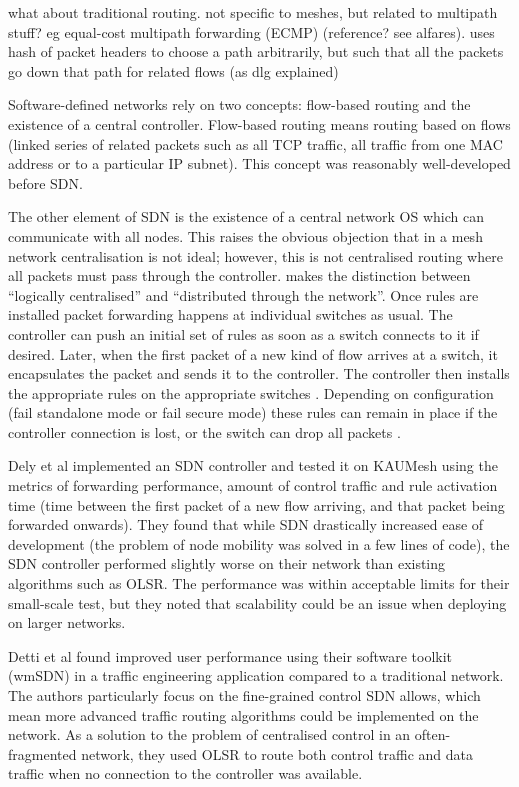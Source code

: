 what about traditional routing. not specific to meshes, but related to multipath stuff? eg equal-cost multipath forwarding (ECMP) (reference? see alfares). uses hash of packet headers to choose a path arbitrarily, but such that all the packets go down that path for related flows (as dlg explained) \cite{alfares:hedera}

Software-defined networks rely on two concepts: flow-based routing and the existence of a central controller. Flow-based routing means routing based on flows (linked series of related packets such as all TCP traffic, all traffic from one MAC address or to a particular IP subnet). This concept was reasonably well-developed \cite{wellons:oblivious,wang:routing} before SDN.

The other element of SDN is the existence of a central network OS which can communicate with all nodes. This raises the obvious objection that in a mesh network centralisation is not ideal; however, this is not centralised routing where all packets must pass through the controller. \cite{handigol:asterix} makes the distinction between ``logically centralised'' and ``distributed through the network''. Once rules are installed packet forwarding happens at individual switches as usual. The controller can push an initial set of rules as soon as a switch connects to it if desired. Later, when the first packet of a new kind of flow arrives at a switch, it encapsulates the packet and sends it to the controller. The controller then installs the appropriate rules on the appropriate switches \cite{mckeown:sdn}. Depending on configuration (fail standalone mode or fail secure mode) these rules can remain in place if the controller connection is lost, or the switch can drop all packets \cite{onf:switch140}.

Dely et al \cite{dely:wmn} implemented an SDN controller and tested it on KAUMesh using the metrics of forwarding performance, amount of control traffic and rule activation time (time between the first packet of a new flow arriving, and that packet being forwarded onwards). They found that while SDN drastically increased ease of development (the problem of node mobility was solved in a few lines of code), the SDN controller performed slightly worse on their network than existing algorithms such as OLSR. The performance was within acceptable limits for their small-scale test, but they noted that scalability could be an issue when deploying on larger networks.

Detti et al \cite{detti:wmsdn} found improved user performance using their software toolkit (wmSDN) in a traffic engineering application compared to a traditional network. The authors particularly focus on the fine-grained control SDN allows, which mean more advanced traffic routing algorithms could be implemented on the network. As a solution to the problem of centralised control in an often-fragmented network, they used OLSR to route both control traffic and data traffic when no connection to the controller was available.

